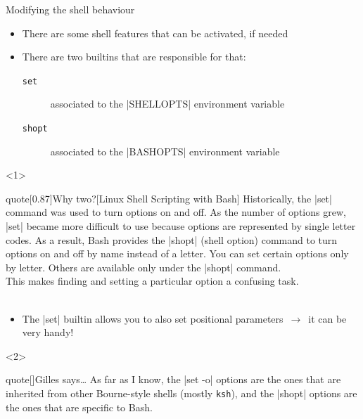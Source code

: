 
\begin{frame}{Modifying the shell behaviour}
    \begin{itemize}
        \item There are some shell features that can be activated, if needed
        \item There are two builtins that are responsible for that:
              \begin{description}
                  \item[\texttt{set}] associated to the \bash|SHELLOPTS| environment variable
                  \item[\texttt{shopt}] associated to the \bash|BASHOPTS| environment variable
              \end{description}
    \end{itemize}
    \begin{onlyenv}<1>
        \begin{varblock}{quote}[0.87\textwidth]{Why two?}[Linux Shell Scripting with Bash]
            Historically, the \textnormal{\bash|set|} command was used to turn options on and off.
            As the number of options grew, \textnormal{\bash|set|} became more difficult to use because options are represented by single letter codes.
            As a result, Bash provides the \textnormal{\bash|shopt|} (shell option) command to turn options on and off by name instead of a letter.
            You can set certain options only by letter.
            Others are available only under the \textnormal{\bash|shopt|} command.\\
            \alert{This makes finding and setting a particular option a confusing task.}\\[-0.5em] ~
        \end{varblock}
        \begin{itemize}
            \item The \bash|set| builtin allows you to also set positional parameters $\,\to\,$ it can be very handy!
        \end{itemize}
    \end{onlyenv}
    \begin{onlyenv}<2>
        \begin{varblock}{quote}[\textwidth]{Gilles says\ldots}
            \footnotesize
            As far as I know, the \textnormal{\bash|set -o|} options are the ones that are inherited from other Bourne-style shells (mostly \textnormal{\texttt{ksh}}), and the \textnormal{\bash|shopt|} options are the ones that are specific to Bash.

\end{varblock}
\end{onlyenv}
\end{frame}
